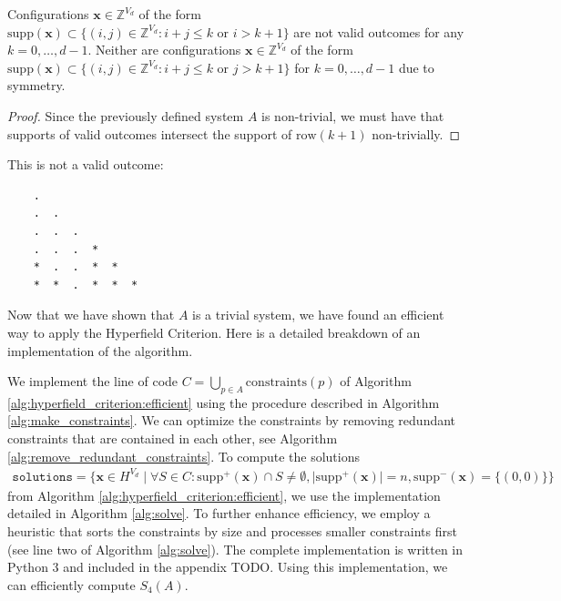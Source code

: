 \begin{corollary}
Configurations $\mathbf{x} \in \mathbb{Z}^{V_{d}}$ of the form $\mathrm{supp}(\mathbf{x}) \subset \{ (i,j) \in \mathbb{Z}^{V_{d}} : i + j \leq k \text{ or } i > k + 1 \}$ are not valid outcomes for any $k = 0, \dots, d-1$. Neither are configurations $\mathbf{x} \in \mathbb{Z}^{V_{d}}$ of the form $\mathrm{supp}(\mathbf{x}) \subset \{ (i,j) \in \mathbb{Z}^{V_{d}} : i + j \leq k \text{ or } j > k + 1 \}$ for $k = 0, \dots, d-1$ due to symmetry.
\end{corollary}

\begin{proof}
Since the previously defined system $A$ is non-trivial, we must have that supports of valid outcomes intersect the support of $\mathrm{row}(k+1)$ non-trivially.
\end{proof}

\begin{example}
This is not a valid outcome:

    \begin{verbatim}
    .               
    .  .           
    .  .  .
    .  .  .  *
    *  .  .  *  *
    *  *  .  *  *  *
\end{verbatim}
\end{example}

Now that we have shown that $A$ is a trivial system, we have found an efficient way to apply the Hyperfield Criterion. Here is a detailed breakdown of an implementation of the algorithm.

We implement the line of code \( C = \bigcup_{p \in A}\mathrm{constraints}(p) \) of Algorithm \ref{alg:hyperfield_criterion:efficient} using the procedure described in Algorithm \ref{alg:make_constraints}. We can optimize the constraints by removing redundant constraints that are contained in each other, see Algorithm \ref{alg:remove_redundant_constraints}. To compute the solutions
\begin{align*}
    \texttt{solutions} = \{ \mathbf{x} \in H^{V_{d}} \mid \forall S \in C: \mathrm{supp}^+(\mathbf{\mathbf{x}}) \cap S \neq \emptyset, \vert \mathrm{supp}^+(\mathbf{x}) \vert = n,  \mathrm{supp}^-(\mathbf{x}) = \{(0,0)\}   \}
\end{align*}
from Algorithm \ref{alg:hyperfield_criterion:efficient}, we use the implementation detailed in Algorithm \ref{alg:solve}. To further enhance efficiency, we employ a heuristic that sorts the constraints by size and processes smaller constraints first (see line two of Algorithm \ref{alg:solve}). The complete implementation is written in Python \( 3 \) and included in the appendix TODO. Using this implementation, we can efficiently compute \( S_4(A) \).


